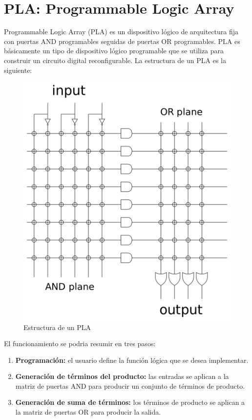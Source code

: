 \documentclass{article}
\begin{document}
\newpage
\section*{PLA: Programmable Logic Array}
Programmable Logic Array (PLA) es un dispositivo lógico de arquitectura fija con puertas AND programables seguidas de puertas OR programables. PLA es básicamente un tipo de dispositivo lógico programable que se utiliza para construir un circuito digital reconfigurable. La estructura de un PLA es la siguiente:

\begin{figure}[h]
    \centering
    \includegraphics[scale=0.2]{PLA.png}
    \caption{Estructura de un PLA}
\end{figure}

El funcionamiento se podria resumir en tres pasos:

\begin{enumerate}
    \item \textbf{Programación:} el usuario define la función lógica que se desea implementar.
    \item \textbf{Generación de términos del producto:} las entradas se aplican a la matriz de puertas AND para producir un conjunto de términos de producto.
    \item \textbf{Generación de suma de términos:} los términos de producto se aplican a la matriz de puertas OR para producir la salida.
\end{enumerate}
\end{document}
